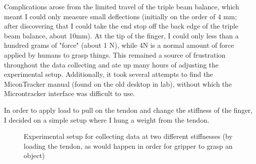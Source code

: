 \documentclass[preprint,12pt,3p]{elsarticle}
\begin{document}
Complications arose from the limited travel of the triple beam balance, which meant I could only
measure small deflections (initially on the order of 4 mm; after discovering that I could take the
end stop off the back edge of the triple beam balance, about 10mm). At the tip of the finger, I
could only less than a hundred grams of "force" (about 1 N), while 4N is a normal amount of force
applied by humans to grasp things. This remained a source of frustration throughout the data
collecting and ate up many hours of adjusting the experimental setup.
Additionally, it took several attempts to find the MiconTracker manual (found on
the old desktop in lab), without which the Microntracker interface was difficult
to use.


In order to apply load to pull on the tendon and change the stiffness of the finger, I decided on a
simple setup where I hung a weight from the tendon.

\begin{figure}[H]
    \centering 
        \hfil %
        \hfil
        \caption{Experimental setup for collecting data at two different
        stiffnesses (by loading the tendon, as would happen in order for gripper
    to grasp an object)}
\end{figure}
\end{document}
